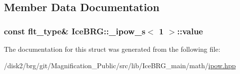 \subsection{Member Data Documentation}
\hypertarget{structIceBRG_1_1__ipow__s_3_011_01_4_a1d31741c9a1f0346fbc6f666034dc87f}{}
\subsubsection[{value}]{\setlength{\rightskip}{0pt plus 5cm}const {\bf flt\+\_\+type}\& {\bf Ice\+B\+R\+G\+::\+\_\+ipow\+\_\+s}$<$ 1 $>$\+::value}\label{structIceBRG_1_1__ipow__s_3_011_01_4_a1d31741c9a1f0346fbc6f666034dc87f}


The documentation for this struct was generated from the following file\+:\begin{DoxyCompactItemize}
\item 
/disk2/brg/git/\+Magnification\+\_\+\+Public/src/lib/\+Ice\+B\+R\+G\+\_\+main/math/\hyperlink{ipow_8hpp}{ipow.\+hpp}\end{DoxyCompactItemize}
